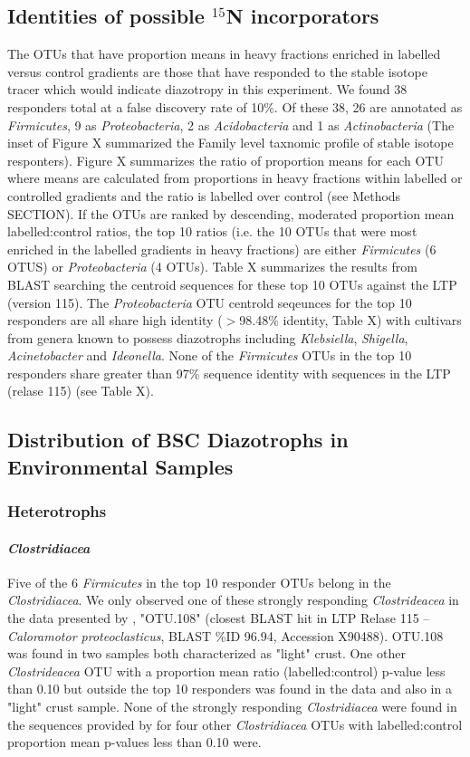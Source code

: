 \subsection{Identities of possible $^{15}$N incorporators}
The OTUs that have proportion means in heavy fractions enriched in labelled versus control gradients are those that have responded to the stable isotope tracer which would indicate diazotropy in this experiment. We found 38 responders total at a false discovery rate of 10\%. Of these 38, 26 are annotated as \textit{Firmicutes}, 9 as \textit{Proteobacteria}, 2 as \textit{Acidobacteria} and 1 as \textit{Actinobacteria} (The inset of Figure X summarized the Family level taxnomic profile of stable isotope responters). Figure X summarizes the ratio of proportion means for each OTU where means are calculated from proportions in heavy fractions within labelled or controlled gradients and the ratio is labelled over control (see Methods SECTION). If the OTUs are ranked by descending, moderated proportion mean labelled:control ratios, the top 10 ratios (i.e. the 10 OTUs that were most enriched in the labelled gradients in heavy fractions) are either \textit{Firmicutes} (6 OTUS) or \textit{Proteobacteria} (4 OTUs). Table X summarizes the results from BLAST searching the centroid sequences for these top 10 OTUs against the LTP (version 115). The \textit{Proteobacteria} OTU centrold seqeunces for the top 10 responders are all share high identity ($>$98.48\% identity, Table X) with cultivars from genera known to possess diazotrophs including \textit{Klebsiella}, \textit{Shigella}, \textit{Acinetobacter} and \textit{Ideonella}. None of the \textit{Firmicutes} OTUs in the top 10 responders share greater than 97\% sequence identity with sequences in the LTP (relase 115) (see Table X).

\subsection{Distribution of BSC Diazotrophs in Environmental Samples}
\subsubsection{Heterotrophs}
\paragraph{\textit{Clostridiacea}}
Five of the 6 \textit{Firmicutes} in the top 10 responder OTUs belong in the \textit{Clostridiacea}. We only observed one of these strongly responding \textit{Clostrideacea} in the data presented by \citet{Garcia_Pichel_2013}, "OTU.108" (closest BLAST hit in LTP Relase 115 -- \textit{Caloramotor proteoclasticus}, BLAST \%ID 96.94, Accession X90488). OTU.108 was found in two samples both characterized as "light" crust. One other \textit{Clostrideacea} OTU with a proportion mean ratio (labelled:control) p-value less than 0.10 but outside the top 10 responders was found in the \citet{Garcia_Pichel_2013} data and also in a "light" crust sample. None of the strongly responding \textit{Clostridiacea} were found in the sequences provided by \citet{Steven_2013} for four other \textit{Clostridiacea} OTUs with labelled:control proportion mean p-values less than 0.10 were.
